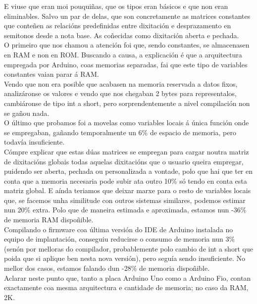    E viuse que eran moi pouquiñas, que os tipos eran básicos e que non eran
   eliminables. Salvo un par de delas, que son concretamente as matrices
   constantes que conteñen as relacións predefinidas entre dixitación e
   desprazamento en semitonos desde a nota base. As coñecidas como dixitación
   aberta e pechada. \\
   
   O primeiro que nos chamou a atención foi que, sendo constantes, se
   almacenasen en RAM e non en ROM. Buscando a causa, a explicación é que a
   arquitectura empregada por Arduino, coas memorias separadas, fai que este
   tipo de variables constantes vaian parar á RAM. \\
   
   Vendo que non era posible que acabasen na memoria reservada a datos fixos,
   analizáronse os valores e vendo que nos chegaban 2 bytes para representalos,
   cambiáronse de tipo int a short, pero sorprendentemente a nivel compilación
   non se gañou nada. \\
   
   O último que probamos foi a movelas como variables locais á única función
   onde se empregaban, gañando temporalmente un 6\% de espacio de memoria, pero
   todavía insuficiente. \\
   
   Cómpre explicar que estas dúas matrices se empregan para cargar noutra matriz
   de dixitacións globais todas aquelas dixitacións que o usuario queira
   empregar, puidendo ser aberta, pechada ou personalizada a vontade, polo que
   hai que ter en conta que a memoria necesaria pode subir ata outro 10\% só
   tendo en conta esta matriz global. E aínda teriamos que deixar marxe para o
   resto de variables locais que, se facemos unha similitude con outros sistemas
   similares, podemos estimar nun 20\% extra. Polo que de maneira estimada e
   aproximada, estamos nun -36\% de memoria RAM dispoñible. \\
   
   Compilando o firmware coa última versión do IDE de Arduino instalada no
   equipo de implantación, conseguiu reducirse o consumo de memoria nun 3\%
   (senón por melloras do compilador, probablemente polo cambio de int a short
   que poida que si aplique ben nesta nova versión), pero seguía sendo
   insuficiente. No mellor dos casos, estamos falando dun -28\% de memoria
   dispoñible. \\
   
   Aclarar neste punto que, tanto a placa Arduino Uno como a Arduino Fio,
   contan exactamente coa mesma arquitectura e cantidade de memoria; no caso da
   RAM, 2K. \\
   
